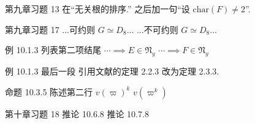 \documentclass{AJerrata}
\begin{document}
\begin{Errata}
		\item[第九章习题 13]
		在``无关根的排序.'' 之后加一句``设 $\mathrm{char}(F) \neq 2$''.
		
		\item[第九章习题 17]
		\Orig ...可约则 $G \simeq D_8$...
		\Corr ...不可约则 $G \simeq D_8$...
		
		\item[例 10.1.3 列表第二项结尾]
		\Orig $\cdots \implies E \in \mathfrak{N}_y$
		\Corr $\cdots \implies F \in \mathfrak{N}_y$
		
		\item[例 10.1.3 最后一段]
		引用文献的定理 2.2.3 改为定理 2.3.3.
		
		\item[命题 10.3.5 陈述第二行]
		\Orig $v(\varpi)^k$
		\Corr $v(\varpi^k)$
		
		\item[第十章习题 18]
		\Orig 推论 10.6.8
		\Corr 推论 10.7.8
	\end{Errata}
\end{document}
